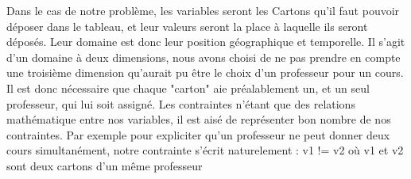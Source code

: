 \begin{center}
\end{center}

\indent

Dans le cas de notre problème, les variables seront les Cartons qu'il faut pouvoir déposer dans le tableau, et leur valeurs seront la place à laquelle ils seront déposés.
Leur domaine est donc leur position géographique et temporelle. 
Il s'agit d'un domaine à deux dimensions, nous avons choisi de ne pas prendre en compte une troisième dimension qu'aurait pu être le choix 
d'un professeur pour un cours. 
Il est donc nécessaire que chaque "carton" aie préalablement un, et un seul professeur, qui lui soit assigné.
Les contraintes n'étant que des relations mathématique entre nos variables, il est aisé de représenter bon nombre de nos contraintes. 
Par exemple pour expliciter qu'un professeur ne peut donner deux cours simultanément, notre contrainte s'écrit naturelement :
v1 != v2 où v1 et v2 sont deux cartons d'un même professeur
% 
% 
